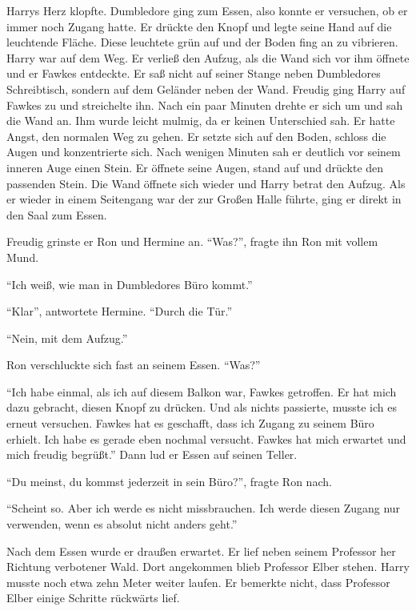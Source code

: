 Harrys Herz klopfte. Dumbledore ging zum Essen, also konnte er versuchen, ob er immer noch Zugang hatte. Er drückte den Knopf und legte seine Hand auf die leuchtende Fläche. Diese leuchtete grün auf und der Boden fing an zu vibrieren. Harry war auf dem Weg. Er verließ den Aufzug, als die Wand sich vor ihm öffnete und er Fawkes entdeckte. Er saß nicht auf seiner Stange neben Dumbledores Schreibtisch, sondern auf dem Geländer neben der Wand. Freudig ging Harry auf Fawkes zu und streichelte ihn. Nach ein paar Minuten drehte er sich um und sah die Wand an. Ihm wurde leicht mulmig, da er keinen Unterschied sah. Er hatte Angst, den normalen Weg zu gehen.  Er setzte sich auf den Boden, schloss die Augen und konzentrierte sich. Nach wenigen Minuten sah er deutlich vor seinem inneren Auge einen Stein. Er öffnete seine Augen, stand auf und drückte den passenden Stein. Die Wand öffnete sich wieder und Harry betrat den Aufzug. Als er wieder in einem Seitengang war der zur Großen Halle führte, ging er direkt in den Saal zum Essen.

Freudig grinste er Ron und Hermine an. \enquote{Was?}, fragte ihn Ron mit vollem Mund.

\enquote{Ich weiß, wie man in Dumbledores Büro kommt.}

\enquote{Klar}, antwortete Hermine. \enquote{Durch die Tür.}

\enquote{Nein, mit dem Aufzug.}

Ron verschluckte sich fast an seinem Essen. \enquote{Was?}

\enquote{Ich habe einmal, als ich auf diesem Balkon war, Fawkes getroffen. Er hat mich dazu gebracht, diesen Knopf zu drücken. Und als nichts passierte, musste ich es erneut versuchen. Fawkes hat es geschafft, dass ich Zugang zu seinem Büro erhielt. Ich habe es gerade eben nochmal versucht. Fawkes hat mich erwartet und mich freudig begrüßt.} Dann lud er Essen auf seinen Teller.

\enquote{Du meinst, du kommst jederzeit in sein Büro?}, fragte Ron nach.

\enquote{Scheint so. Aber ich werde es nicht missbrauchen. Ich werde diesen Zugang nur verwenden, wenn es absolut nicht anders geht.}

Nach dem Essen wurde er draußen erwartet. Er lief neben seinem Professor her Richtung verbotener Wald. Dort angekommen blieb Professor Elber stehen. Harry musste noch etwa zehn Meter weiter laufen. Er bemerkte nicht, dass Professor Elber einige Schritte rückwärts lief.

